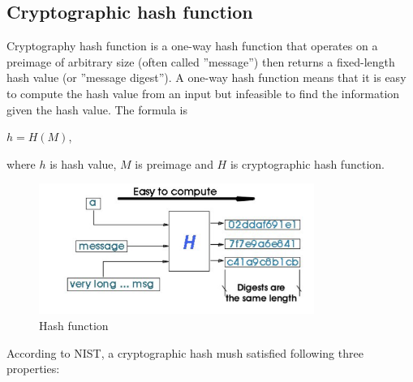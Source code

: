 \subsection{Cryptographic hash function}

Cryptography hash function is a one-way hash function that operates on a preimage of arbitrary size (often called ”message”) then returns a fixed-length hash value (or ”message digest”). A one-way hash function means that it is easy to compute the hash value from an input but infeasible to find the information given the hash value. The formula is\\

\begin{center}
  $h = H(M)$,\\
\end{center}

where $h$ is hash value, $M$ is preimage and $H$ is cryptographic hash function.\\

\begin{figure}[ht!]
  \centering
  \includegraphics[width=0.8\textwidth]{images/hash_function.png}
  \caption[Hash function]{Hash function}
  \label{fig:hash_function}
\end{figure}

According to NIST, a cryptographic hash mush satisfied following three properties:

